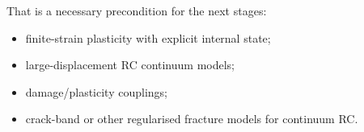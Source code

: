 That is a necessary precondition for the next stages:
\begin{itemize}
  \item finite-strain plasticity with explicit internal state;
  \item large-displacement RC continuum models;
  \item damage/plasticity couplings;
  \item crack-band or other regularised fracture models for continuum RC.
\end{itemize}
